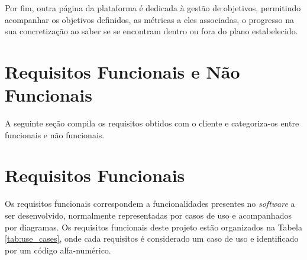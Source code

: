 Por fim, outra página da plataforma é dedicada à gestão de objetivos, permitindo acompanhar os objetivos definidos, as métricas a eles associadas, o progresso na sua concretização ao saber se se encontram dentro ou fora do plano estabelecido.

\section{Requisitos Funcionais e Não Funcionais}

A seguinte seção compila os requisitos obtidos com o cliente e categoriza-os entre funcionais e não funcionais.

\section{Requisitos Funcionais}

Os requisitos funcionais correspondem a funcionalidades presentes no \textit{software} a ser desenvolvido, normalmente representadas por casos de uso e acompanhados por diagramas. Os requisitos funcionais deste projeto estão organizados na Tabela \ref{tab:use_cases}, onde cada requisitos é considerado um caso de uso e identificado por um código alfa-numérico.

